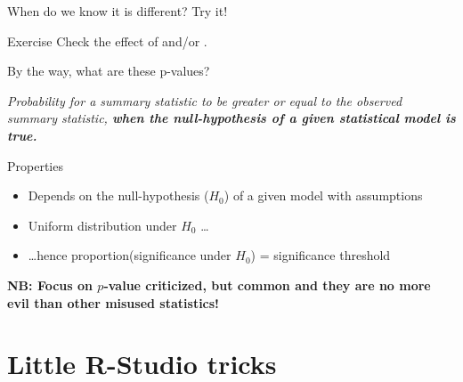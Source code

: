 \documentclass[10pt]{beamer}\usepackage[]{graphicx}\usepackage[]{color}
\begin{document}

\begin{frame}[fragile]{When do we know it is different? Try it!}

\begin{alertblock}{Exercise}
Check the effect of {\color{orange}{smaller variability}} and/or {\color{blue}{larger sample size}}.
\end{alertblock}
\end{frame}

\begin{frame}{By the way, what are these p-values?}%

\textit{Probability for a summary statistic to be greater or equal to the observed summary statistic, \textbf{when the null-hypothesis of a given statistical model is true.}}

\pause

\begin{exampleblock}{Properties}
  \begin{itemize}
    \item Depends on the null-hypothesis ($H_0$) of a given model with assumptions
    \item Uniform distribution under $H_0$ \dots
    \item \dots hence proportion(significance under $H_0$) = significance threshold
  \end{itemize}
\end{exampleblock}

\pause
\textbf{NB: Focus on $p$-value criticized, but common and they are no more evil than other misused statistics!}
\end{frame}

\begin{frame}{}

\end{frame}



\section{Little R-Studio tricks}
\end{document}
